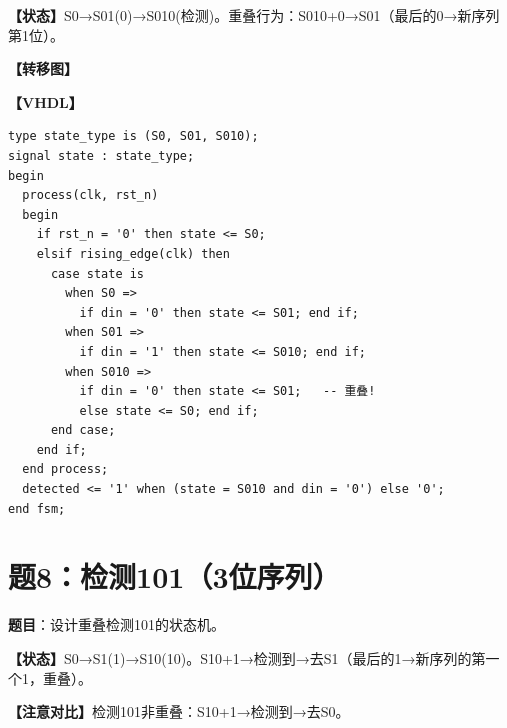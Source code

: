 \begin{solution}[完整解答]

\textbf{【状态】}S0→S01(0)→S010(检测)。重叠行为：S010+0→S01（最后的0→新序列第1位）。

\textbf{【转移图】}
\begin{center}
\end{center}

\textbf{【VHDL】}
\begin{lstlisting}
type state_type is (S0, S01, S010);
signal state : state_type;
begin
  process(clk, rst_n)
  begin
    if rst_n = '0' then state <= S0;
    elsif rising_edge(clk) then
      case state is
        when S0 =>
          if din = '0' then state <= S01; end if;
        when S01 =>
          if din = '1' then state <= S010; end if;
        when S010 =>
          if din = '0' then state <= S01;   -- 重叠!
          else state <= S0; end if;
      end case;
    end if;
  end process;
  detected <= '1' when (state = S010 and din = '0') else '0';
end fsm;
\end{lstlisting}

\end{solution}


\section{题8：检测101（3位序列）}

\textbf{题目}：设计重叠检测101的状态机。

\begin{solution}[完整解答]

\textbf{【状态】}S0→S1(1)→S10(10)。S10+1→检测到→去S1（最后的1→新序列的第一个1，重叠）。

\textbf{【注意对比】}检测101非重叠：S10+1→检测到→去S0。

\end{solution}


